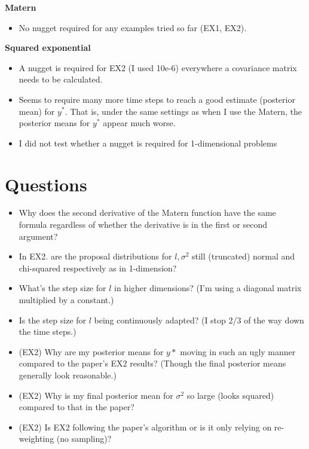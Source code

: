 \documentclass{sfuthesis}
\begin{document}
\textbf{Matern}
\begin{itemize}
\item No nugget required for any examples tried so far (EX1, EX2).
\end{itemize}

\textbf{Squared exponential}
\begin{itemize}
\item A nugget is required for EX2 (I used 10e-6) everywhere a covariance matrix needs to be calculated. 
\item Seems to require many more time steps to reach a good estimate (posterior mean) for $y^*$. That is, under the same settings as when I use the Matern, the posterior means for $y^*$ appear much worse.  
\item I did not test whether a nugget is required for 1-dimensional problems
\end{itemize}


\section{Questions}

\begin{itemize}
\item Why does the second derivative of the Matern function have the same formula regardless of whether the derivative is in the first or second argument?
\item In EX2. are the proposal distributions for $l, \sigma^2$ still (truncated) normal and chi-squared respectively as in 1-dimension?
\item What's the step size for $l$ in higher dimensions? (I'm using a diagonal matrix multiplied by a constant.)
\item Is the step size for $l$ being continuously adapted? (I stop 2/3 of the way down the time steps.)
\item (EX2) Why are my posterior means for $y*$ moving in such an ugly manner compared to the paper's EX2 results? (Though the final posterior means generally look reasonable.)
\item (EX2) Why is my final posterior mean for $\sigma^2$ so large (looks squared) compared to that in the paper?
\item (EX2) Is EX2 following the paper's algorithm or is it only relying on re-weighting (no sampling)? 

\end{itemize}
\end{document}
